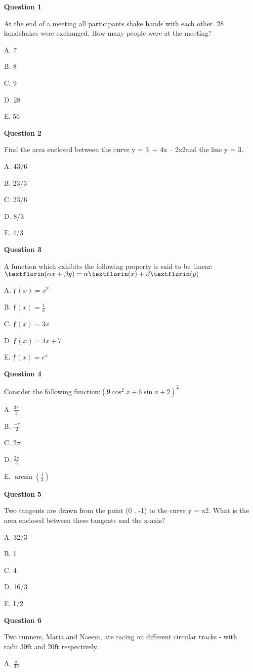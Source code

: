 \textbf{Question 1}

At the end of a meeting all participants shake hands with each other. 28 handshakes were exchanged. How many people were at the meeting?

A. 7

B. 8

C. 9

D. 28

E. 56


\textbf{Question 2}

Find the area enclosed between the curve y = 3 + 4x – 2x2and the line y = 3.

A. 43/6

B. 23/3

C. 23/6

D. 8/3

E. 4/3


\textbf{Question 3}

A function which exhibits the following property is said to be linear:\(ƒ(\alpha x+\beta y)=\alphaƒ(x)+\beta ƒ(y)\)

A. \(ƒ(x)=x^2\)

B. \(ƒ(x)=\frac{1}{x}\)

C. \(ƒ(x)=3x\)

D. \(ƒ(x)=4x+7\)

E. \(ƒ(x)=e^x\)


\textbf{Question 4}

Consider the following function:\((9\cos^2x+6\sin x+2)^2\)

A. \(\frac{3\pi}{2}\)

B. \(\frac{-\pi}{2}\)

C. \(2\pi\)

D. \(\frac{2\pi}{3}\)

E. \(\arcsin(\frac{1}{3})\)


\textbf{Question 5}

Two tangents are drawn from the point (0 , -1) to the curve y = x2. What is the area enclosed between these tangents and the x-axis?

A. 32/3

B. 1

C. 4

D. 16/3

E. 1/2


\textbf{Question 6}

Two runners, Maria and Naeem, are racing on different circular tracks - with radii 30ft and 20ft respectively.

A. \(\frac{\pi}{3v}\)

